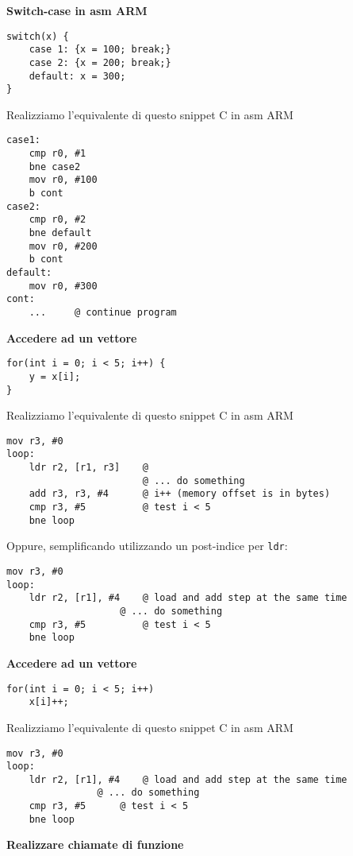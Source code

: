 \begin{defn}
\textbf{Switch-case in asm ARM}

\begin{lstlisting}
switch(x) {
	case 1: {x = 100; break;}
	case 2: {x = 200; break;}
	default: x = 300;
}
\end{lstlisting}

Realizziamo l'equivalente di questo snippet C in asm ARM

\begin{lstlisting}[style=armn]
case1:
	cmp r0, #1
	bne case2
	mov r0, #100
	b cont
case2:
	cmp r0, #2
	bne default
	mov r0, #200
	b cont
default:
	mov r0, #300
cont:
	... 	@ continue program
\end{lstlisting}
\end{defn}


\begin{exmp}
\textbf{Accedere ad un vettore}
\begin{lstlisting}
for(int i = 0; i < 5; i++) {
	y = x[i];
}
\end{lstlisting}

Realizziamo l'equivalente di questo snippet C in asm ARM

\begin{lstlisting}[style=armn]
mov r3, #0
loop:
	ldr r2, [r1, r3]	@
						@ ... do something
	add r3, r3, #4 		@ i++ (memory offset is in bytes)
	cmp r3, #5			@ test i < 5
	bne loop
\end{lstlisting}

Oppure, semplificando utilizzando un post-indice per \verb|ldr|:

\begin{lstlisting}[style=armn]
mov r3, #0
loop:
	ldr r2, [r1], #4	@ load and add step at the same time
					@ ... do something
	cmp r3, #5			@ test i < 5
	bne loop
\end{lstlisting}
\end{exmp}

\begin{exmp}
\textbf{Accedere ad un vettore}
\begin{lstlisting}
for(int i = 0; i < 5; i++)
	x[i]++;
\end{lstlisting}

Realizziamo l'equivalente di questo snippet C in asm ARM


\begin{lstlisting}[style=armn]
mov r3, #0
loop:
	ldr r2, [r1], #4	@ load and add step at the same time
				@ ... do something
	cmp r3, #5		@ test i < 5
	bne loop
\end{lstlisting}
\end{exmp}


\begin{exmp}
\textbf{Realizzare chiamate di funzione}
\end{exmp}